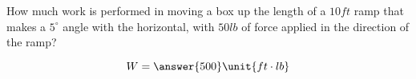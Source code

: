 \documentclass{ximera}
\author{Gregory Hartman \and Matthew Carr}
\begin{document}
\begin{exercise}




How much work is performed in moving a box up the length of a $10\unit{ft}$ ramp that makes a $5^\circ$ angle with the horizontal, with $50\unit{lb}$ of force applied in the direction of the ramp?


\begin{prompt}
\[
W=\answer{500}\unit{ft\cdot lb}
\]
\end{prompt}

\end{exercise}
\end{document}
